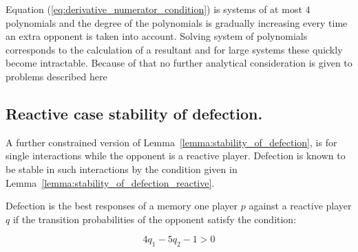 Equation (\ref{eq:derivative_numerator_condition}) is systems of at most \(4\)
polynomials and the degree of the polynomials is gradually increasing every time
an extra opponent is taken into account.
Solving system of polynomials corresponds to the calculation of a resultant and
for large systems these quickly become intractable.
Because of that no further analytical consideration is given to problems
described here

\subsection{Reactive case stability of defection.}

A further constrained version of Lemma~\ref{lemma:stability_of_defection}, is
for single interactions while the opponent is a reactive player. Defection is
known to be stable in such interactions by the condition given in
Lemma~\ref{lemma:stability_of_defection_reactive}.

\begin{lemma}\label{lemma:stability_of_defection_reactive}
    Defection is the best responses of a memory one player \(p\) against a reactive
    player \(q\) if the transition probabilities of the opponent satisfy the
    condition:
    
    \begin{equation}
        4 q_{1} - 5 q_{2} - 1 > 0
    \end{equation}
    \end{lemma}

